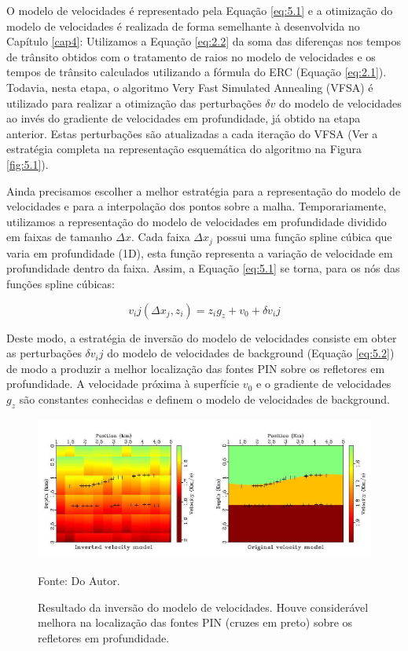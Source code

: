 O modelo de velocidades é representado pela Equação \ref{eq:5.1} e a
otimização do modelo de velocidades é realizada de forma semelhante à desenvolvida no Capítulo \ref{cap4}:
Utilizamos a Equação \ref{eq:2.2} da soma das diferenças nos tempos de trânsito obtidos com o tratamento de raios no modelo de velocidades e os tempos de trânsito calculados utilizando a fórmula do ERC (Equação \ref{eq:2.1}). Todavia, nesta etapa, o algoritmo Very Fast Simulated Annealing (VFSA) é utilizado para realizar a otimização das perturbações $\delta v$ do modelo de velocidades ao invés do gradiente de velocidades em
profundidade, já obtido na etapa anterior. Estas perturbações são atualizadas a cada iteração do VFSA (Ver a estratégia completa na representação esquemática do algoritmo na Figura \ref{fig:5.1}).

Ainda precisamos escolher a melhor estratégia para a representação do modelo de velocidades
e para a interpolação dos pontos sobre a malha. Temporariamente, utilizamos a representação
do modelo de velocidades em profundidade dividido em faixas de tamanho $\Delta x$.
Cada faixa $\Delta x_j$ possui uma função spline cúbica que varia em profundidade
(1D), esta função representa a variação de velocidade em profundidade dentro da faixa.
Assim, a Equação \ref{eq:5.1} se torna, para os nós das funções spline cúbicas:

\begin{equation}
\label{eq:5.2}
v_ij(\Delta x_j,z_i)=z_i g_z+v_0+\delta v_ij
\end{equation}

Deste modo, a estratégia de inversão do modelo de velocidades consiste em obter
as perturbações $\delta v_ij$ do modelo de velocidades de background (Equação \ref{eq:5.2})
de modo a produzir a melhor localização das fontes PIN sobre os refletores em profundidade.
A velocidade próxima à superfície $v_0$ e o gradiente de velocidades $g_z$ são constantes conhecidas
e definem o modelo de velocidades de background.

\begin{figure}[H]
\caption{Resultado da inversão do modelo de velocidades. Houve considerável melhora na
localização das fontes PIN (cruzes em preto) sobre os refletores em profundidade.}
\begin{center}
\includegraphics[scale=2]{images/inverted-original.jpeg}
\vspace{-0.3cm}
\end{center}
\begin{center}
 Fonte: Do Autor.
\end{center}
\label{fig:5.2}
\end{figure}

